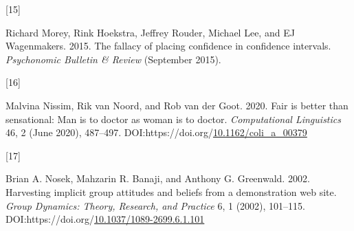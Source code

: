 \documentclass[
  10pt,
  dvipsnames,enabledeprecatedfontcommands]{scrartcl}
\newlength{\cslhangindent}
\newlength{\csllabelwidth}
\newlength{\cslentryspacingunit} %
\newenvironment{CSLReferences}[2] %
 {%
  \setlength{\parindent}{0pt}
  \ifodd #1
  \let\oldpar\par
  \def\par{\hangindent=\cslhangindent\oldpar}
  \fi
  \setlength{\parskip}{#2\cslentryspacingunit}
 }%
 {}
\newcommand{\CSLLeftMargin}[1]{\parbox[t]{\csllabelwidth}{#1}}
\newcommand{\CSLRightInline}[1]{\parbox[t]{\linewidth - \csllabelwidth}{#1}\break}
\begin{document}
\begin{CSLReferences}{0}{0}
\leavevmode{}%
\CSLLeftMargin{{[}15{]} }%
\CSLRightInline{Richard Morey, Rink Hoekstra, Jeffrey Rouder, Michael
Lee, and EJ Wagenmakers. 2015. The fallacy of placing confidence in
confidence intervals. \emph{Psychonomic Bulletin \& Review} (September
2015).}

\leavevmode{}%
\CSLLeftMargin{{[}16{]} }%
\CSLRightInline{Malvina Nissim, Rik van Noord, and Rob van der Goot.
2020. Fair is better than sensational: Man is to doctor as woman is to
doctor. \emph{Computational Linguistics} 46, 2 (June 2020), 487--497.
DOI:https://doi.org/\href{https://doi.org/10.1162/coli_a_00379}{10.1162/coli\_a\_00379}}

\leavevmode{}%
\CSLLeftMargin{{[}17{]} }%
\CSLRightInline{Brian A. Nosek, Mahzarin R. Banaji, and Anthony G.
Greenwald. 2002. Harvesting implicit group attitudes and beliefs from a
demonstration web site. \emph{Group Dynamics: Theory, Research, and
Practice} 6, 1 (2002), 101--115.
DOI:https://doi.org/\href{https://doi.org/10.1037/1089-2699.6.1.101}{10.1037/1089-2699.6.1.101}}

\end{CSLReferences}
\end{document}
